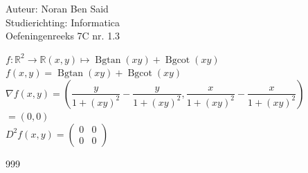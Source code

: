 \documentclass[a4paper]{article}
\begin{document}
  
\noindent \large Auteur: Noran Ben Said \\
\noindent \large Studierichting: Informatica\\
\noindent \large Oefeningenreeks 7C nr. 1.3\\

\medskip

\normalsize


$f: \mathbb{R}^2 \to \mathbb{R} (x, y) \mapsto \operatorname{Bgtan}(xy) + \operatorname{Bgcot}(xy)$ \\


$f(x, y) = \operatorname{Bgtan}(xy) + \operatorname{Bgcot}(xy)$ \\

$\nabla f(x, y) = \left( \dfrac{y}{1 + (xy)^2} - \dfrac{y}{1 + (xy)^2}, \dfrac{x}{1 + (xy)^2} - \dfrac{x}{1 + (xy)^2} \right)$ \\

$= (0, 0)$ \\

$D^2 f(x, y) =
\left(
\begin{array}{ccc}
0 & 0\\
0 & 0
\end{array}
\right)
$\\


\begin{thebibliography}{999}
\end{thebibliography}
\end{document}
